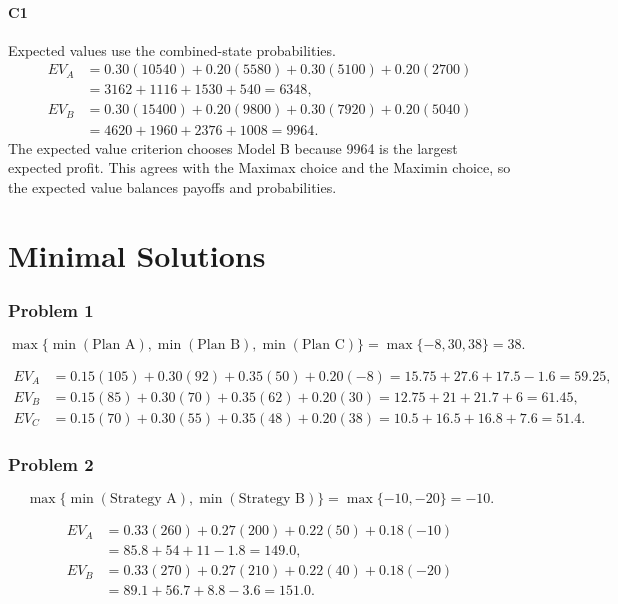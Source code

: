 		\subsection*{C1}
		Expected values use the combined-state probabilities.
		\[
		\begin{aligned}
		EV_A &= 0.30(10540)+0.20(5580)+0.30(5100)+0.20(2700)\\
		&= 3162+1116+1530+540=6348,\\
		EV_B &= 0.30(15400)+0.20(9800)+0.30(7920)+0.20(5040)\\
		&= 4620+1960+2376+1008=9964.
		\end{aligned}
		\]
		The expected value criterion chooses Model B because 9964 is the largest expected profit. This agrees with the Maximax choice and the Maximin choice, so the expected value balances payoffs and probabilities.



\part{Minimal Solutions}

\section*{Problem 1}
\[\max\{\min(\text{Plan A}), \min(\text{Plan B}), \min(\text{Plan C})\}
		= \max\{-8, 30, 38\}
		= 38.\]

\[\begin{aligned}
		EV_A &= 0.15(105)+0.30(92)+0.35(50)+0.20(-8)=15.75+27.6+17.5-1.6=59.25,\\
		EV_B &= 0.15(85)+0.30(70)+0.35(62)+0.20(30)=12.75+21+21.7+6=61.45,\\
		EV_C &= 0.15(70)+0.30(55)+0.35(48)+0.20(38)=10.5+16.5+16.8+7.6=51.4.
		\end{aligned}\]

\section*{Problem 2}
\[\max\{\min(\text{Strategy A}), \min(\text{Strategy B})\}
		= \max\{-10, -20\}
		= -10.\]

\[\begin{aligned}
		EV_A &= 0.33(260)+0.27(200)+0.22(50)+0.18(-10)\\
		&= 85.8+54+11-1.8=149.0,\\
		EV_B &= 0.33(270)+0.27(210)+0.22(40)+0.18(-20)\\
		&= 89.1+56.7+8.8-3.6=151.0.
		\end{aligned}\]

